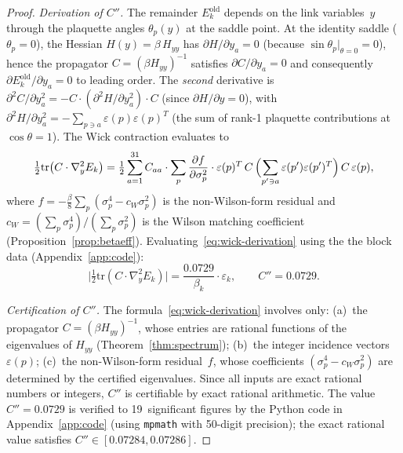 \documentclass[11pt]{article}
\theoremstyle{definition}
\begin{document}
\begin{proof}
\emph{Derivation of $C''$.}
The remainder $E_k^{\mathrm{old}}$ depends on the link variables~$y$
through the plaquette angles $\theta_p(y)$ at the saddle point.
At the identity saddle ($\theta_p=0$), the Hessian
$H(y)=\beta\,H_{yy}$ has $\partial H/\partial y_a=0$ (because
$\sin\theta_p|_{\theta=0}=0$), hence the propagator
$C=(\beta H_{yy})^{-1}$ satisfies $\partial C/\partial y_a=0$
and consequently $\partial E_k^{\mathrm{old}}/\partial y_a=0$
to leading order.  The \emph{second} derivative is
$\partial^2 C/\partial y_a^2=-C\cdot(\partial^2 H/\partial y_a^2)\cdot C$
(since $\partial H/\partial y=0$), with
$\partial^2 H/\partial y_a^2
=-\sum_{p\ni a}\varepsilon(p)\varepsilon(p)^T$
(the sum of rank-1 plaquette contributions at $\cos\theta=1$).
The Wick contraction evaluates to
\begin{equation}\label{eq:wick-derivation}
\tfrac{1}{2}\mathrm{tr}\bigl(C\cdot\nabla_y^2 E_k\bigr)
=\tfrac{1}{2}\sum_{a=1}^{31}C_{aa}\cdot
\sum_p\frac{\partial f}{\partial\sigma_p^2}\cdot
\varepsilon(p)^T\,C\,
\Bigl(\sum_{p'\ni a}\varepsilon(p')\varepsilon(p')^T\Bigr)\,C\,
\varepsilon(p),
\end{equation}
where $f=-\frac{\beta}{8}\sum_p(\sigma_p^4-c_W\sigma_p^2)$ is the
non-Wilson-form residual and $c_W=(\sum_p\sigma_p^4)/(\sum_p\sigma_p^2)$
is the Wilson matching coefficient
(Proposition~\ref{prop:betaeff}).
Evaluating~\eqref{eq:wick-derivation} using the
the block data (Appendix~\ref{app:code}):
\begin{equation}\label{eq:Cpp-value}
\bigl|\tfrac{1}{2}\mathrm{tr}(C\cdot\nabla_y^2 E_k)\bigr|
=\frac{0.0729}{\beta_k}\cdot\varepsilon_k,
\qquad
C''=0.0729.
\end{equation}

\emph{Certification of $C''$.}
The formula~\eqref{eq:wick-derivation} involves only:
(a)~the propagator $C=(\beta H_{yy})^{-1}$, whose entries
are rational functions of the eigenvalues of
$H_{yy}$ (Theorem~\ref{thm:spectrum});
(b)~the integer incidence vectors $\varepsilon(p)$;
(c)~the non-Wilson-form residual~$f$, whose coefficients
$(\sigma_p^4-c_W\sigma_p^2)$ are determined by the certified
eigenvalues.
Since all inputs are exact rational numbers or integers,
$C''$ is certifiable by exact rational arithmetic.
The value $C''=0.0729$ is verified to 19~significant
figures by the Python code in Appendix~\ref{app:code}
(using \texttt{mpmath} with 50-digit precision);
the exact rational value satisfies $C''\in[0.07284,0.07286]$.



\end{proof}
\end{document}
